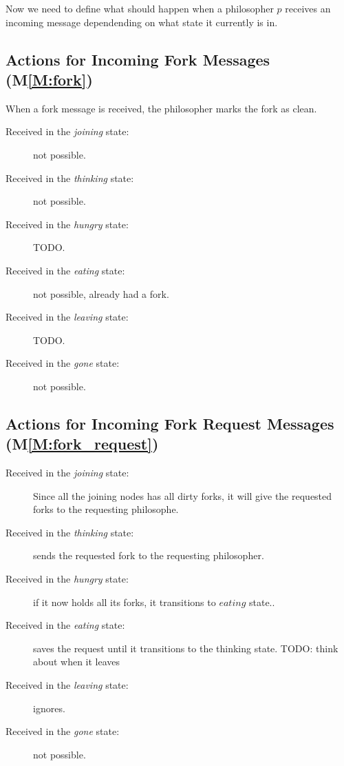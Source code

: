 \documentclass[11pt]{article}
\begin{document}
Now we need to define what should happen when a philosopher $p$ receives an incoming message dependending on what state it currently is in.
\subsection{Actions for Incoming Fork Messages (M\ref{M:fork})}
When a fork message is received, the philosopher marks the fork as clean.
\begin{description}
\item[Received in the \textit{joining} state:] not possible.
\item[Received in the \textit{thinking} state:] not possible.
\item[Received in the \textit{hungry} state:] TODO.
\item[Received in the \textit{eating} state:] not possible, already had a fork.
\item[Received in the \textit{leaving} state:] TODO.
\item[Received in the \textit{gone} state:] not possible.
\end{description}
\subsection{Actions for Incoming Fork Request Messages (M\ref{M:fork_request})}

\begin{description}
\item[Received in the \textit{joining} state:] Since all the joining nodes has all dirty forks, it will give the requested forks to the requesting philosophe.
\item[Received in the \textit{thinking} state:] sends the requested fork to the requesting philosopher.
\item[Received in the \textit{hungry} state:] if it now holds all its forks, it transitions to $eating$ state..
\item[Received in the \textit{eating} state:] saves the request until it transitions to the thinking state. TODO: think about when it leaves
\item[Received in the \textit{leaving} state:] ignores.
\item[Received in the \textit{gone} state:] not possible.
\end{description}
\end{document}
